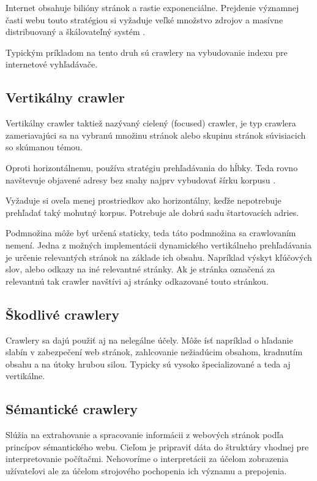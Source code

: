 Internet obsahuje bilióny stránok a rastie exponenciálne. Prejdenie významnej časti webu touto stratégiou si vyžaduje veľké množstvo zdrojov a masívne distribuovaný a škálovateľný systém \cite{horizontalCrawl}. 

Typickým príkladom na tento druh sú crawlery na vybudovanie indexu pre internetové vyhľadávače.

\subsection{Vertikálny crawler}
Vertikálny crawler taktiež nazývaný cielený (focused) crawler, je typ crawlera zameriavajúci sa na vybranú množinu stránok alebo skupinu stránok súvisiacich so skúmanou témou.

Oproti horizontálnemu, používa stratégiu prehľadávania do hĺbky. Teda rovno navštevuje objavené adresy bez snahy najprv vybudovať šírku korpusu \cite{verticalSearch}. 

Vyžaduje si oveľa menej prostriedkov ako horizontálny, keďže nepotrebuje prehľadať taký mohutný korpus. Potrebuje ale dobrú sadu štartovacích adries.

Podmnožina môže byť určená staticky, teda táto podmnožina sa crawlovaním nemení. Jedna z možných implementácii dynamického vertikálneho prehľadávania je určenie relevantých stránok na základe ich obsahu. Napríklad výskyt kľúčových slov, alebo odkazy na iné relevantné stránky. Ak je stránka označená za relevantnú tak crawler navštívi aj stránky odkazované touto stránkou. 

\subsection{Škodlivé crawlery}
Crawlery sa dajú použiť aj na nelegálne účely. Môže ísť napríklad o hľadanie slabín v zabezpečení web stránok, zahlcovanie nežiadúcim obsahom, kradnutím obsahu a na útoky hrubou silou. Typicky sú vysoko špecializované a teda aj vertikálne. 


\subsection{Sémantické crawlery}
Slúžia na extrahovanie a spracovanie informácii z webových stránok podľa princípov sémantického webu. Cieľom je pripraviť dáta do štruktúry vhodnej pre interpretovanie počítačmi. Nehovoríme o interpretácii za účelom zobrazenia užívateľovi ale za účelom strojového pochopenia ich významu a prepojenia. \cite{semanticWeb}

